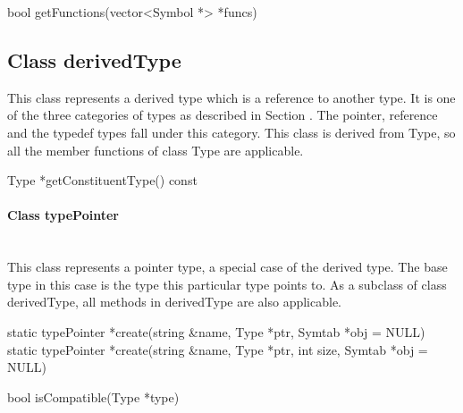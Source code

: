 \begin{apient}
bool getFunctions(vector<Symbol *> *funcs)
\end{apient}

\subsection{Class derivedType}
This class represents a derived type which is a reference to another type. It is one of the three categories of types as described in Section . The pointer, reference and the typedef types fall under this category. This class is derived from Type, so all the member functions of class Type are applicable.


\begin{apient}
Type *getConstituentType() const
\end{apient}

\paragraph{Class typePointer}
\mbox{ }\\

This class represents a pointer type, a special case of the derived type. The base type in this case is the type this particular type points to. As a subclass of class derivedType, all methods in derivedType are also applicable. 


\begin{apient}
static typePointer *create(string &name, Type *ptr,
                        Symtab *obj = NULL)
static typePointer *create(string &name, Type *ptr, int size, 
                        Symtab *obj = NULL)
\end{apient}

\begin{apient}
bool isCompatible(Type *type)
\end{apient}

